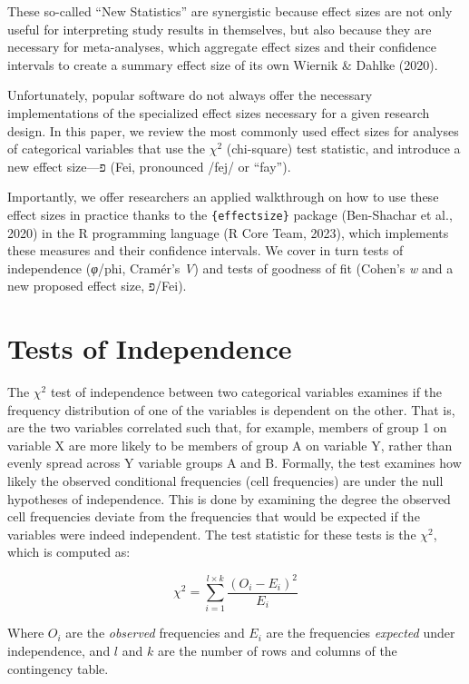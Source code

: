 \documentclass[
]{article}
\begin{document}
These so-called ``New Statistics'' are synergistic because effect sizes
are not only useful for interpreting study results in themselves, but
also because they are necessary for meta-analyses, which aggregate
effect sizes and their confidence intervals to create a summary effect
size of its own Wiernik \& Dahlke (2020).

Unfortunately, popular software do not always offer the necessary
implementations of the specialized effect sizes necessary for a given
research design. In this paper, we review the most commonly used effect
sizes for analyses of categorical variables that use the \(\chi^2\)
(chi-square) test statistic, and introduce a new effect size---פ (Fei,
pronounced /fej/ or ``fay'').

Importantly, we offer researchers an applied walkthrough on how to use
these effect sizes in practice thanks to the \texttt{\{effectsize\}}
package (Ben-Shachar et al., 2020) in the R programming language (R Core
Team, 2023), which implements these measures and their confidence
intervals. We cover in turn tests of independence (\emph{φ}/phi,
Cramér's \emph{V}) and tests of goodness of fit (Cohen's \emph{w} and a
new proposed effect size, פ/Fei).

\hypertarget{tests-of-independence}{%
\section{Tests of Independence}\label{tests-of-independence}}

The \(\chi^2\) test of independence between two categorical variables
examines if the frequency distribution of one of the variables is
dependent on the other. That is, are the two variables correlated such
that, for example, members of group 1 on variable X are more likely to
be members of group A on variable Y, rather than evenly spread across Y
variable groups A and B. Formally, the test examines how likely the
observed conditional frequencies (cell frequencies) are under the null
hypotheses of independence. This is done by examining the degree the
observed cell frequencies deviate from the frequencies that would be
expected if the variables were indeed independent. The test statistic
for these tests is the \(\chi^2\), which is computed as:

\[
\chi^2 = \sum_{i=1}^{l\times k}{\frac{(O_i-E_i)^2}{E_i}}
\]

Where \(O_i\) are the \emph{observed} frequencies and \(E_i\) are the
frequencies \emph{expected} under independence, and \(l\) and \(k\) are
the number of rows and columns of the contingency table.
\end{document}
